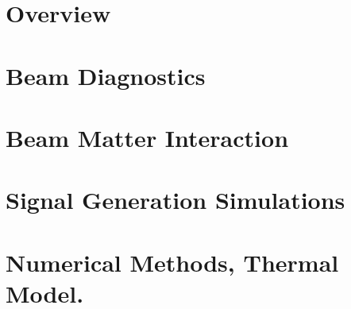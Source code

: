 \documentclass[12pt,twoside,openright]{report}
\begin{document}


\pagestyle{plain}




\chapter{Overview} \label{ch:Overview}



\chapter{Beam Diagnostics} \label{ch:BeamDiagnostics}



\chapter{Beam Matter Interaction} 
\label{ch:BeamMatterInter}


\chapter{Signal Generation Simulations} 
\label{ch:CurrentModeling}


\chapter{Numerical Methods, Thermal Model.}
\label{ch:TempModeling}


\label{ch:EmissivityMeas}

\label{ch:H0Hm}




\printbibliography 
\end{document}
